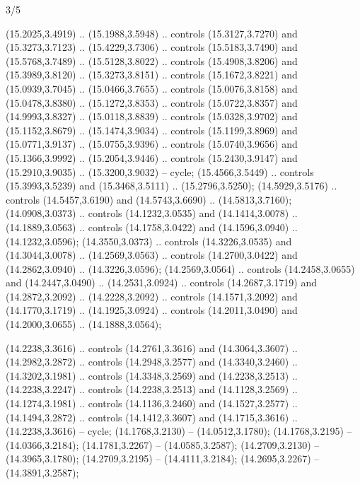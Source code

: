 \begin{flagdescription}{3/5}
{\begin{scope}[fill=gold]
  (15.2025,3.4919) .. (15.1988,3.5948) .. controls (15.3127,3.7270) and
  (15.3273,3.7123) .. (15.4229,3.7306) .. controls (15.5183,3.7490) and
  (15.5768,3.7489) .. (15.5128,3.8022) .. controls (15.4908,3.8206) and
  (15.3989,3.8120) .. (15.3273,3.8151) .. controls (15.1672,3.8221) and
  (15.0939,3.7045) .. (15.0466,3.7655) .. controls (15.0076,3.8158) and
  (15.0478,3.8380) .. (15.1272,3.8353) .. controls (15.0722,3.8357) and
  (14.9993,3.8327) .. (15.0118,3.8839) .. controls (15.0328,3.9702) and
  (15.1152,3.8679) .. (15.1474,3.9034) .. controls (15.1199,3.8969) and
  (15.0771,3.9137) .. (15.0755,3.9396) .. controls (15.0740,3.9656) and
  (15.1366,3.9992) .. (15.2054,3.9446) .. controls (15.2430,3.9147) and
  (15.2910,3.9035) .. (15.3200,3.9032) -- cycle;
 (15.4566,3.5449) .. controls (15.3993,3.5239) and
  (15.3468,3.5111) .. (15.2796,3.5250);
 (14.5929,3.5176) .. controls (14.5457,3.6190) and
  (14.5743,3.6690) .. (14.5813,3.7160);
 (14.0908,3.0373) .. controls (14.1232,3.0535) and
  (14.1414,3.0078) .. (14.1889,3.0563) .. controls (14.1758,3.0422) and
  (14.1596,3.0940) .. (14.1232,3.0596);
 (14.3550,3.0373) .. controls (14.3226,3.0535) and
  (14.3044,3.0078) .. (14.2569,3.0563) .. controls (14.2700,3.0422) and
  (14.2862,3.0940) .. (14.3226,3.0596);
 (14.2569,3.0564) .. controls (14.2458,3.0655) and
  (14.2447,3.0490) .. (14.2531,3.0924) .. controls (14.2687,3.1719) and
  (14.2872,3.2092) .. (14.2228,3.2092) .. controls (14.1571,3.2092) and
  (14.1770,3.1719) .. (14.1925,3.0924) .. controls (14.2011,3.0490) and
  (14.2000,3.0655) .. (14.1888,3.0564);
\end{scope}
\begin{scope}[fill=red,line width=0.006\lw]
 (14.2238,3.3616) .. controls (14.2761,3.3616) and
  (14.3064,3.3607) .. (14.2982,3.2872) .. controls (14.2948,3.2577) and
  (14.3340,3.2460) .. (14.3202,3.1981) .. controls (14.3348,3.2569) and
  (14.2238,3.2513) .. (14.2238,3.2247) .. controls (14.2238,3.2513) and
  (14.1128,3.2569) .. (14.1274,3.1981) .. controls (14.1136,3.2460) and
  (14.1527,3.2577) .. (14.1494,3.2872) .. controls (14.1412,3.3607) and
  (14.1715,3.3616) .. (14.2238,3.3616) -- cycle;
 (14.1768,3.2130) -- (14.0512,3.1780);
 (14.1768,3.2195) -- (14.0366,3.2184);
 (14.1781,3.2267) -- (14.0585,3.2587);
 (14.2709,3.2130) -- (14.3965,3.1780);
 (14.2709,3.2195) -- (14.4111,3.2184);
 (14.2695,3.2267) -- (14.3891,3.2587);

\end{scope}}
\end{flagdescription}
